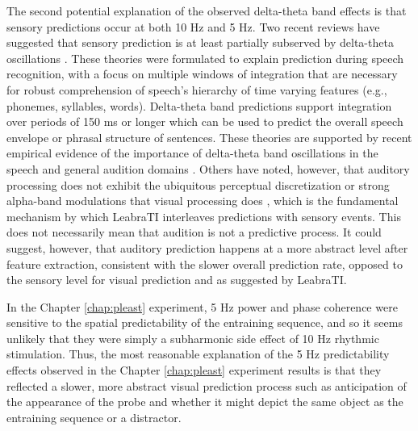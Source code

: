\documentclass[dwyatte_dissertation.tex]{subfiles}
\begin{document}
The second potential explanation of the observed delta-theta band effects is that sensory predictions occur at both 10 Hz and 5 Hz. Two recent reviews have suggested that sensory prediction is at least partially subserved by delta-theta oscillations \cite{ArnalGiraud12,GiraudPoeppel12}. These theories were formulated to explain prediction during speech recognition, with a focus on multiple windows of integration that are necessary for robust comprehension of speech's hierarchy of time varying features (e.g., phonemes, syllables, words). Delta-theta band predictions support integration over periods of 150 ms or longer which can be used to predict the overall speech envelope \cite{AikenPicton08} or phrasal structure of sentences. These theories are supported by recent empirical evidence of the importance of delta-theta band oscillations in the speech \cite{ArnalWyartGiraud11} and general audition domains . Others have noted, however, that auditory processing does not exhibit the ubiquitous perceptual discretization or strong alpha-band modulations that visual processing does \cite{VanRullenZoefelIlhan14,WeiszHartmannMullerEtAl11}, which is the fundamental mechanism by which LeabraTI interleaves predictions with sensory events. This does not necessarily mean that audition is not a predictive process. It could suggest, however, that auditory prediction happens at a more abstract level after feature extraction, consistent with the slower overall prediction rate, opposed to the sensory level for visual prediction and as suggested by LeabraTI. 

In the Chapter \ref{chap:pleast} experiment, 5 Hz power and phase coherence were sensitive to the spatial predictability of the entraining sequence, and so it seems unlikely that they were simply a subharmonic side effect of 10 Hz rhythmic stimulation. Thus, the most reasonable explanation of the 5 Hz predictability effects observed in the Chapter \ref{chap:pleast} experiment results is that they reflected a slower, more abstract visual prediction process such as anticipation of the appearance of the probe and whether it might depict the same object as the entraining sequence or a distractor.
\end{document}
